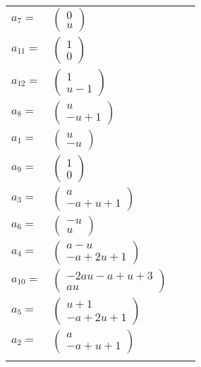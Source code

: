 \documentclass[1p]{elsarticle_modified}
\theoremstyle{definition}
\begin{document}
\begin{tabular}{m{7pt} m{180pt} m{7pt} m{180pt} }
\flushright $a_{7}=$&$\begin{pmatrix}0\\u\end{pmatrix}$ \\
\flushright $a_{11}=$&$\begin{pmatrix}1\\0\end{pmatrix}$ \\
\flushright $a_{12}=$&$\begin{pmatrix}1\\u-1\end{pmatrix}$ \\
\flushright $a_{8}=$&$\begin{pmatrix}u\\- u+1\end{pmatrix}$ \\
\flushright $a_{1}=$&$\begin{pmatrix}u\\- u\end{pmatrix}$ \\
\flushright $a_{9}=$&$\begin{pmatrix}1\\0\end{pmatrix}$ \\
\flushright $a_{3}=$&$\begin{pmatrix}a\\- a+u+1\end{pmatrix}$ \\
\flushright $a_{6}=$&$\begin{pmatrix}- u\\u\end{pmatrix}$ \\
\flushright $a_{4}=$&$\begin{pmatrix}a- u\\- a+2 u+1\end{pmatrix}$ \\
\flushright $a_{10}=$&$\begin{pmatrix}-2 a u- a+u+3\\a u\end{pmatrix}$ \\
\flushright $a_{5}=$&$\begin{pmatrix}u+1\\- a+2 u+1\end{pmatrix}$ \\
\flushright $a_{2}=$&$\begin{pmatrix}a\\- a+u+1\end{pmatrix}$\\&\end{tabular}
\end{document}
